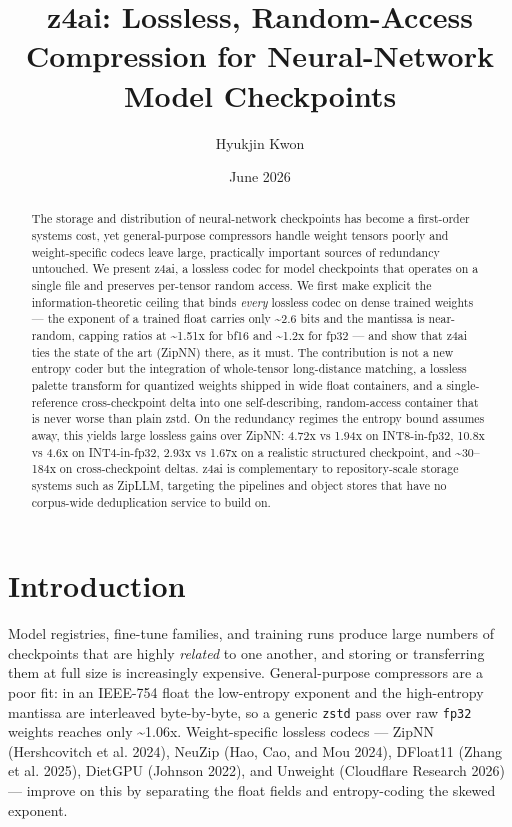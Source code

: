 \documentclass[
]{article}
\title{z4ai: Lossless, Random-Access Compression for Neural-Network
Model Checkpoints}
\author{Hyukjin Kwon}
\date{June 2026}
\begin{document}
\maketitle
\begin{abstract}
The storage and distribution of neural-network checkpoints has become a
first-order systems cost, yet general-purpose compressors handle weight
tensors poorly and weight-specific codecs leave large, practically
important sources of redundancy untouched. We present z4ai, a lossless
codec for model checkpoints that operates on a single file and preserves
per-tensor random access. We first make explicit the
information-theoretic ceiling that binds \emph{every} lossless codec on
dense trained weights --- the exponent of a trained float carries only
\textasciitilde2.6 bits and the mantissa is near-random, capping ratios
at \textasciitilde1.51x for bf16 and \textasciitilde1.2x for fp32 ---
and show that z4ai ties the state of the art (ZipNN) there, as it must.
The contribution is not a new entropy coder but the integration of
whole-tensor long-distance matching, a lossless palette transform for
quantized weights shipped in wide float containers, and a
single-reference cross-checkpoint delta into one self-describing,
random-access container that is never worse than plain zstd. On the
redundancy regimes the entropy bound assumes away, this yields large
lossless gains over ZipNN: 4.72x vs 1.94x on INT8-in-fp32, 10.8x vs 4.6x
on INT4-in-fp32, 2.93x vs 1.67x on a realistic structured checkpoint,
and \textasciitilde30--184x on cross-checkpoint deltas. z4ai is
complementary to repository-scale storage systems such as ZipLLM,
targeting the pipelines and object stores that have no corpus-wide
deduplication service to build on.
\end{abstract}

\section{Introduction}\label{introduction}

Model registries, fine-tune families, and training runs produce large
numbers of checkpoints that are highly \emph{related} to one another,
and storing or transferring them at full size is increasingly expensive.
General-purpose compressors are a poor fit: in an IEEE-754 float the
low-entropy exponent and the high-entropy mantissa are interleaved
byte-by-byte, so a generic \texttt{zstd} pass over raw \texttt{fp32}
weights reaches only \textasciitilde1.06x. Weight-specific lossless
codecs --- ZipNN (Hershcovitch et al. 2024), NeuZip (Hao, Cao, and Mou
2024), DFloat11 (Zhang et al. 2025), DietGPU (Johnson 2022), and
Unweight (Cloudflare Research 2026) --- improve on this by separating
the float fields and entropy-coding the skewed exponent.
\end{document}
